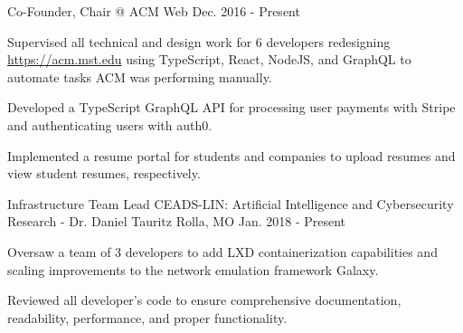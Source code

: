 \begin{cventries}
\cventry
  {Co-Founder, Chair @ ACM Web} %
  {} %
  {} %
  {Dec. 2016 - Present} %
  {
    \begin{cvitems} %
      \item {Supervised all technical and design work for 6 developers
             redesigning \url{https://acm.mst.edu} using TypeScript, React,
             NodeJS, and GraphQL to automate tasks ACM was performing
             manually.}
      \item {Developed a TypeScript GraphQL API for processing user payments
             with Stripe and authenticating users with auth0.}
      \item {Implemented a resume portal for students and companies to upload resumes
             and view student resumes, respectively.}
    \end{cvitems}
  }




\cventry
  {Infrastructure Team Lead} %
  {CEADS-LIN: Artificial Intelligence and Cybersecurity Research - Dr. Daniel Tauritz} %
  {Rolla, MO} %
  {Jan. 2018 - Present} %
  {
    \begin{cvitems} %
      \item {Oversaw a team of 3 developers to add LXD containerization
        capabilities and scaling improvements to the network emulation framework
        Galaxy.}
      \item {Reviewed all developer's code to ensure comprehensive
        documentation, readability, performance, and proper functionality.}
    \end{cvitems}
  }


\end{cventries}
